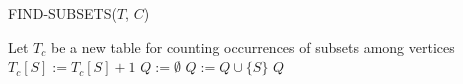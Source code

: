 \begin{algorithm}[H]
    \caption{FIND-SUBSETS($T$, $C$)}\label{alg:find-subsets}
    \begin{algorithmic}[1]
        \State Let $T_c$ be a new table for counting occurrences of subsets among vertices
                \State $T_c[S] := T_c[S] + 1$
            \EndFor
        \EndFor
        \State $Q := \emptyset$
                \State $Q := Q \cup \{S\}$
            \EndIf
        \EndFor
        \State \Return $Q$
    \end{algorithmic}
\end{algorithm}